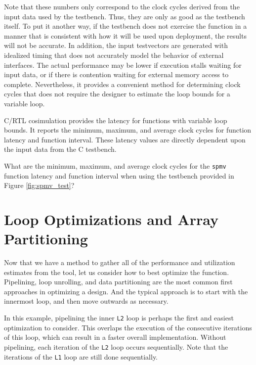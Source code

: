Note that these numbers only correspond to the clock cycles derived from the input data used by the testbench. Thus, they are only as good as the testbench itself. To put it another way, if the testbench does not exercise the function in a manner that is consistent with how it will be used upon deployment, the results will not be accurate. In addition, the input testvectors are generated with idealized timing that does not accurately model the behavior of external interfaces.  The actual performance may be lower if execution stalls waiting for input data, or if there is contention waiting for external memory access to complete.  Nevertheless, it provides a convenient method for determining clock cycles that does not require the designer to estimate the loop bounds for a variable loop.

\begin{aside}
C/RTL cosimulation provides the latency for functions with variable loop bounds. It reports the minimum, maximum, and average clock cycles for function latency and function interval. These latency values are directly dependent upon the input data from the C testbench. 
\end{aside}

\begin{exercise}
What are the minimum, maximum, and average clock cycles for the \lstinline{spmv} function latency and function interval when using the testbench provided in Figure \ref{fig:spmv_test}?
\end{exercise}


\section{Loop Optimizations and Array Partitioning}

Now that we have a method to gather all of the performance and utilization estimates from the \VHLS tool, let us consider how to best optimize the function. Pipelining, loop unrolling, and data partitioning are the most common first approaches in optimizing a design. And the typical approach is to start with the innermost loop, and then move outwards as necessary.

In this example, pipelining the inner \lstinline{L2} loop is perhaps the first and easiest optimization to consider. This overlaps the execution of the consecutive iterations of this loop, which can result in a faster overall implementation. Without pipelining, each iteration of the \lstinline{L2} loop occurs sequentially. Note that the iterations of the \lstinline{L1} loop are still done sequentially. 

